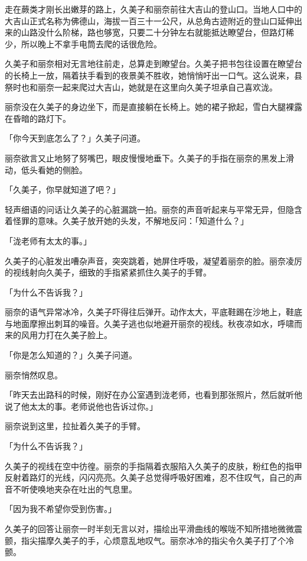\documentclass[UTF8]{ctexart}
\begin{document}
    走在蕨类才刚长出嫩芽的路上，久美子和丽奈前往大吉山的登山口。当地人口中的大吉山正式名称为佛德山，海拔一百三十一公尺，从总角古迹附近的登山口延伸出来的山路没什么阶梯，路也够宽，只要二十分钟左右就能抵达瞭望台，但路灯稀少，所以晚上不拿手电筒去爬的话很危险。 

    久美子和丽奈相对无言地往前走，总算走到瞭望台。久美子把书包往设置在瞭望台的长椅上一放，隔着扶手看到的夜景美不胜收，她悄悄吁出一口气。这么说来，县祭时也和丽奈一起来爬过大吉山，她就是在这里向久美子坦承自己喜欢泷。 

    丽奈没在久美子的身边坐下，而是直接躺在长椅上。她的裙子掀起，雪白大腿裸露在昏暗的路灯下。 

    「你今天到底怎么了？」久美子问道。 

    丽奈欲言又止地努了努嘴巴，眼皮慢慢地垂下。久美子的手指在丽奈的黑发上滑动，低头看她的侧脸。 

    「久美子，你早就知道了吧？」 

    轻声细语的问话让久美子的心脏漏跳一拍。丽奈的声音听起来与平常无异，但隐含着怪罪的意味。久美子放开她的头发，不解地反问：「知道什么？」 

    「泷老师有太太的事。」 

    久美子的心脏发出嘈杂声音，突突跳着，她屏住呼吸，凝望着丽奈的脸。丽奈凌厉的视线射向久美子，细致的手指紧紧抓住久美子的手臂。 

    「为什么不告诉我？」 

    丽奈的语气异常冰冷，久美子吓得往后弹开。动作太大，平底鞋踢在沙地上，鞋底与地面摩擦出刺耳的噪音。久美子逃也似地避开丽奈的视线。秋夜凉如水，呼啸而来的风用力打在久美子脸上。 

    「你是怎么知道的？」久美子问道。 

    丽奈悄然叹息。 

    「昨天去出路科的时候，刚好在办公室遇到泷老师，也看到那张照片，然后就听他说了他太太的事。老师说他也告诉过你。」 

    丽奈说到这里，拉扯着久美子的手臂。 

    「为什么不告诉我？」 

    久美子的视线在空中彷徨。丽奈的手指隔着衣服陷入久美子的皮肤，粉红色的指甲反射着路灯的光线，闪闪亮亮。久美子总觉得呼吸好困难，忍不住叹气，自己的声音不听使唤地夹杂在吐出的气息里。 

    「因为我不希望你受到伤害。」 

    久美子的回答让丽奈一时半刻无言以对，描绘出平滑曲线的喉咙不知所措地微微震颤，指尖描摩久美子的手，心烦意乱地叹气。丽奈冰冷的指尖令久美子打了个冷颤。 
\end{document}
